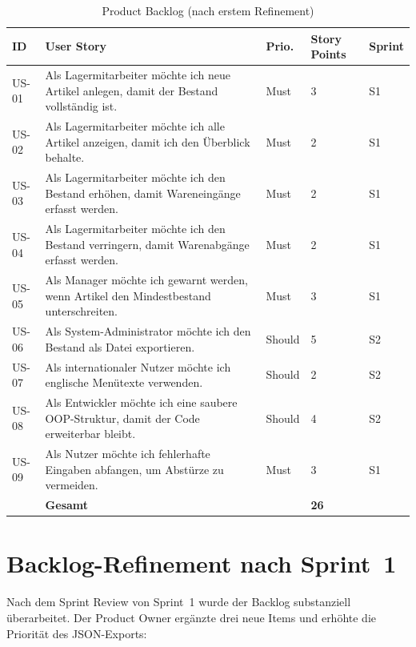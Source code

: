 \documentclass[12pt, a4paper, twoside]{report}
\begin{document}
\begin{table}[H]
  \centering
  \caption{Product Backlog (nach erstem Refinement)}
  \label{tab:backlog}
  \begin{tabularx}{\textwidth}{C{0.7cm} L{5.5cm} C{2cm} C{2cm} C{1.5cm}}
    \toprule
    \textbf{ID} & \textbf{User Story} & \textbf{Prio.} & \textbf{Story Points} & \textbf{Sprint} \\
    \midrule
    US-01 & Als Lagermitarbeiter möchte ich neue Artikel anlegen, damit der Bestand vollständig ist.
           & Must & 3 & S1 \\
    US-02 & Als Lagermitarbeiter möchte ich alle Artikel anzeigen, damit ich den Überblick behalte.
           & Must & 2 & S1 \\
    US-03 & Als Lagermitarbeiter möchte ich den Bestand erhöhen, damit Wareneingänge erfasst werden.
           & Must & 2 & S1 \\
    US-04 & Als Lagermitarbeiter möchte ich den Bestand verringern, damit Warenabgänge erfasst werden.
           & Must & 2 & S1 \\
    US-05 & Als Manager möchte ich gewarnt werden, wenn Artikel den Mindestbestand unterschreiten.
           & Must & 3 & S1 \\
    US-06 & Als System-Administrator möchte ich den Bestand als Datei exportieren.
           & Should & 5 & S2 \\
    US-07 & Als internationaler Nutzer möchte ich englische Menütexte verwenden.
           & Should & 2 & S2 \\
    US-08 & Als Entwickler möchte ich eine saubere OOP-Struktur, damit der Code erweiterbar bleibt.
           & Should & 4 & S2 \\
    US-09 & Als Nutzer möchte ich fehlerhafte Eingaben abfangen, um Abstürze zu vermeiden.
           & Must & 3 & S1 \\
    \midrule
    & \textbf{Gesamt} & & \textbf{26} & \\
    \bottomrule
  \end{tabularx}
\end{table}

\section{Backlog-Refinement nach Sprint~1}

Nach dem Sprint Review von Sprint~1 wurde der Backlog substanziell überarbeitet.
Der Product Owner ergänzte drei neue Items und erhöhte die Priorität des JSON-Exports:
\end{document}
